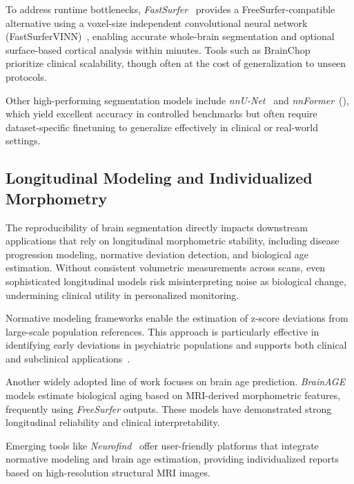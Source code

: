 \documentclass{midl} %
\begin{document}
To address runtime bottlenecks, \textit{FastSurfer}~\citep{Henschel2020FastSurfer} provides a FreeSurfer-compatible alternative using a voxel-size independent convolutional neural network (FastSurferVINN)~\citep{henschel2022fastsurfervinn}, enabling accurate whole-brain segmentation and optional surface-based cortical analysis within minutes. Tools such as BrainChop~\citep{BrainChopJOSS} prioritize clinical scalability, though often at the cost of generalization to unseen protocols.

Other high-performing segmentation models include \textit{nnU-Net}~\citep{isensee2021nnu} and \textit{nnFormer}~(\citep{zhou2023nnformer}), which yield excellent accuracy in controlled benchmarks but often require dataset-specific finetuning to generalize effectively in clinical or real-world settings.

\subsection{Longitudinal Modeling and Individualized Morphometry}

The reproducibility of brain segmentation directly impacts downstream applications that rely on longitudinal morphometric stability, including disease progression modeling, normative deviation detection, and biological age estimation. Without consistent volumetric measurements across scans, even sophisticated longitudinal models risk misinterpreting noise as biological change, undermining clinical utility in personalized monitoring.

Normative modeling frameworks enable the estimation of z-score deviations from large-scale population references. This approach is particularly effective in identifying early deviations in psychiatric populations and supports both clinical and subclinical applications~\citep{marquand2016understanding}.

Another widely adopted line of work focuses on brain age prediction. \textit{BrainAGE}~\citep{franke2012brainage} models estimate biological aging based on MRI-derived morphometric features, frequently using \textit{FreeSurfer} outputs. These models have demonstrated strong longitudinal reliability and clinical interpretability.

Emerging tools like \textit{Neurofind}~\citep{neurofind2025} offer user-friendly platforms that integrate normative modeling and brain age estimation, providing individualized reports based on high-resolution structural MRI images.
\end{document}
